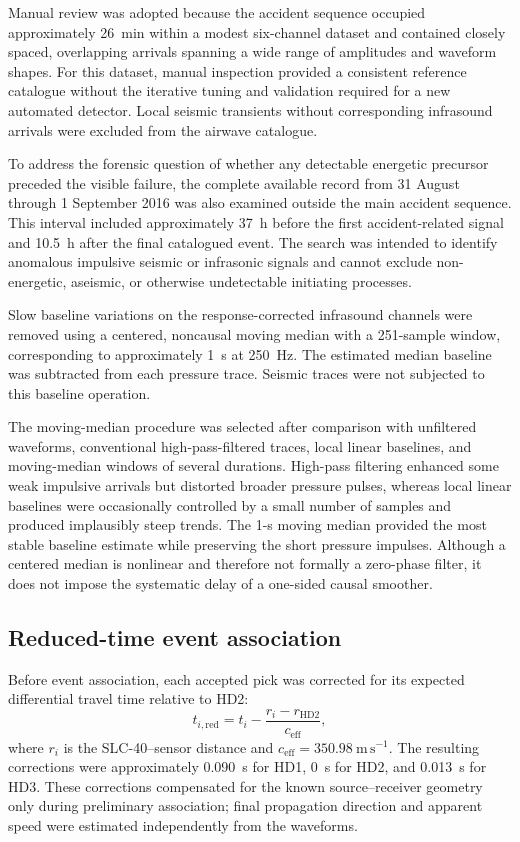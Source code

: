 \documentclass[]{seismica}
\begin{document}
Manual review was adopted because the accident sequence occupied approximately 26~min within a modest six-channel dataset and contained closely spaced, overlapping arrivals spanning a wide range of amplitudes and waveform shapes. For this dataset, manual inspection provided a consistent reference catalogue without the iterative tuning and validation required for a new automated detector. Local seismic transients without corresponding infrasound arrivals were excluded from the airwave catalogue.

To address the forensic question of whether any detectable energetic precursor
preceded the visible failure, the complete available record from 31 August
through 1 September 2016 was also examined outside the main accident sequence.
This interval included approximately 37~h before the first accident-related
signal and 10.5~h after the final catalogued event. The search was intended to
identify anomalous impulsive seismic or infrasonic signals and cannot exclude
non-energetic, aseismic, or otherwise undetectable initiating processes.

Slow baseline variations on the response-corrected infrasound channels were removed using a centered, noncausal moving median with a 251-sample window, corresponding to approximately 1~s at 250~Hz. The estimated median baseline was subtracted from each pressure trace. Seismic traces were not subjected to this baseline operation.

The moving-median procedure was selected after comparison with unfiltered waveforms, conventional high-pass-filtered traces, local linear baselines, and moving-median windows of several durations. High-pass filtering enhanced some weak impulsive arrivals but distorted broader pressure pulses, whereas local linear baselines were occasionally controlled by a small number of samples and produced implausibly steep trends. The 1-s moving median provided the most stable baseline estimate while preserving the short pressure impulses. Although a centered median is nonlinear and therefore not formally a zero-phase filter, it does not impose the systematic delay of a one-sided causal smoother.

\subsection{Reduced-time event association}

Before event association, each accepted pick was corrected for its expected differential travel time relative to HD2:
\begin{equation}
  t_{i,\mathrm{red}} = t_i - \frac{r_i-r_{\mathrm{HD2}}}{c_{\mathrm{eff}}},
  \label{eq:reduced_time}
\end{equation}
where $r_i$ is the SLC-40--sensor distance and $c_{\mathrm{eff}}=350.98~\mathrm{m\,s^{-1}}$. The resulting corrections were approximately 0.090~s for HD1, 0~s for HD2, and 0.013~s for HD3. These corrections compensated for the known source--receiver geometry only during preliminary association; final propagation direction and apparent speed were estimated independently from the waveforms.
\end{document}

